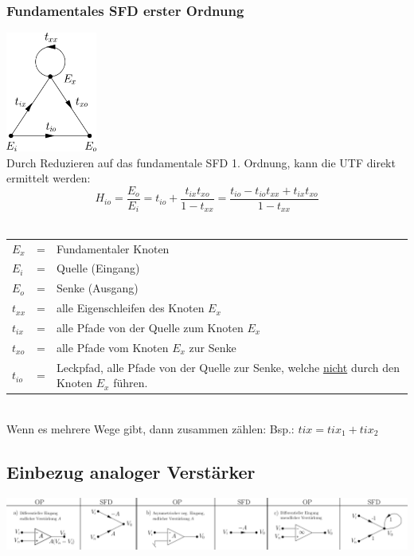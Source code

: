 \begin{minipage}[t]{8cm}
\subsubsection{Fundamentales SFD erster Ordnung }
	\includegraphics[width=3cm]{./bilder/sfd-fundamental-erster-ordnung.png} \\
	Durch Reduzieren auf das fundamentale SFD 1. Ordnung, kann die UTF direkt
	ermittelt werden: \\
	\[ H_{io} = \frac{E_o}{E_i}=
	t_{io}+\frac{t_{ix}t_{xo}}{1-t_{xx}}=
	\frac{t_{io}-t_{io}t_{xx}+t_{ix}t_{xo}}{1-t_{xx}} \] \\
	\begin{tabular}{l l p{7cm}}
		$E_x$ & = & Fundamentaler Knoten\\
		$E_i$ & = & Quelle (Eingang) \\
		$E_o$ & = & Senke (Ausgang) \\
		$t_{xx}$ & = & alle Eigenschleifen des Knoten $E_x$ \\
		$t_{ix}$ & = & alle Pfade von der Quelle zum Knoten $E_x$ \\
		$t_{xo}$ & = &alle Pfade vom Knoten $E_x$ zur Senke \\
		$t_{io}$ & = & Leckpfad, alle Pfade von der Quelle zur Senke, welche \underline{nicht}
		durch den Knoten $E_x$ führen.
	\end{tabular}\\
	Wenn es mehrere Wege gibt, dann zusammen zählen: Bsp.: $tix = tix_1 +
	tix_2$
\end{minipage}

\subsection{Einbezug analoger Verstärker }
\includegraphics[width=18cm]{./bilder/sfd-op.png}

